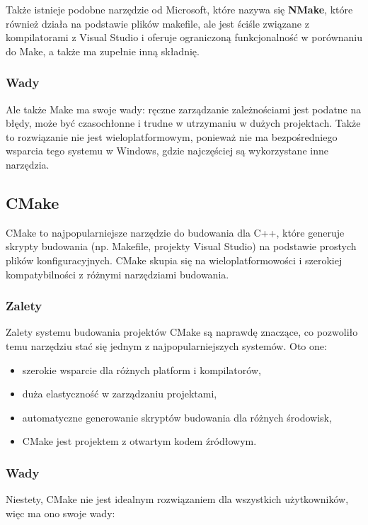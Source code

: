 Także istnieje podobne narzędzie od Microsoft, które nazywa się \textbf{NMake}, które również działa na podstawie plików makefile, ale jest ściśle związane z kompilatorami z Visual Studio i oferuje ograniczoną funkcjonalność w porównaniu do Make, a także ma zupełnie inną składnię.

\subsubsection{Wady}
Ale także Make ma swoje wady: ręczne zarządzanie zależnościami jest podatne na błędy, może być czasochłonne i trudne w utrzymaniu w dużych projektach. Także to rozwiązanie nie jest wieloplatformowym, ponieważ nie ma bezpośredniego wsparcia tego systemu w Windows, gdzie najczęściej są wykorzystane inne narzędzia.

\subsection{CMake}
CMake to najpopularniejsze narzędzie do budowania dla C++, które generuje skrypty budowania (np. Makefile, projekty Visual Studio) na podstawie prostych plików konfiguracyjnych. CMake skupia się na wieloplatformowości i szerokiej kompatybilności z różnymi narzędziami budowania.

\subsubsection{Zalety}
Zalety systemu budowania projektów CMake są naprawdę znaczące, co pozwoliło temu narzędziu stać się jednym z najpopularniejszych systemów. Oto one:

\begin{itemize}
    \item szerokie wsparcie dla różnych platform i kompilatorów,
    \item duża elastyczność w zarządzaniu projektami,
    \item automatyczne generowanie skryptów budowania dla różnych środowisk,
    \item CMake jest projektem z otwartym kodem źródłowym.
\end{itemize}

\subsubsection{Wady}
Niestety, CMake nie jest idealnym rozwiązaniem dla wszystkich użytkowników, więc ma ono swoje wady:

